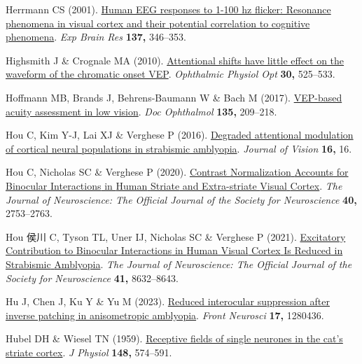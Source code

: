 \documentclass[
  letterpaper,
  DIV=11,
  numbers=noendperiod]{scrartcl}
\newlength{\cslhangindent}
\newenvironment{CSLReferences}[2] %
 {\begin{list}{}{%
  \setlength{\itemindent}{0pt}
  \setlength{\leftmargin}{0pt}
  \setlength{\parsep}{0pt}
  \ifodd #1
   \setlength{\leftmargin}{\cslhangindent}
   \setlength{\itemindent}{-1\cslhangindent}
  \fi
  \setlength{\itemsep}{#2\baselineskip}}}
 {\end{list}}
\begin{document}
\begin{CSLReferences}{1}{1}
Herrmann CS (2001). \href{https://doi.org/10.1007/s002210100682}{Human
EEG responses to 1-100 hz flicker: Resonance phenomena in visual cortex
and their potential correlation to cognitive phenomena}. \emph{Exp Brain
Res} \textbf{137,} 346--353.

Highsmith J \& Crognale MA (2010).
\href{https://doi.org/10.1111/j.1475-1313.2010.00747.x}{Attentional
shifts have little effect on the waveform of the chromatic onset VEP}.
\emph{Ophthalmic Physiol Opt} \textbf{30,} 525--533.

Hoffmann MB, Brands J, Behrens-Baumann W \& Bach M (2017).
\href{https://doi.org/10.1007/s10633-017-9613-y}{VEP-based acuity
assessment in low vision}. \emph{Doc Ophthalmol} \textbf{135,} 209--218.

Hou C, Kim Y-J, Lai XJ \& Verghese P (2016).
\href{https://doi.org/10.1167/16.3.16}{Degraded attentional modulation
of cortical neural populations in strabismic amblyopia}. \emph{Journal
of Vision} \textbf{16,} 16.

Hou C, Nicholas SC \& Verghese P (2020).
\href{https://doi.org/10.1523/JNEUROSCI.2043-19.2020}{Contrast
{Normalization} {Accounts} for {Binocular} {Interactions} in {Human}
{Striate} and {Extra}-striate {Visual} {Cortex}}. \emph{The Journal of
Neuroscience: The Official Journal of the Society for Neuroscience}
\textbf{40,} 2753--2763.

Hou 侯川 C, Tyson TL, Uner IJ, Nicholas SC \& Verghese P (2021).
\href{https://doi.org/10.1523/JNEUROSCI.0268-21.2021}{Excitatory
{Contribution} to {Binocular} {Interactions} in {Human} {Visual}
{Cortex} {Is} {Reduced} in {Strabismic} {Amblyopia}}. \emph{The Journal
of Neuroscience: The Official Journal of the Society for Neuroscience}
\textbf{41,} 8632--8643.

Hu J, Chen J, Ku Y \& Yu M (2023).
\href{https://doi.org/10.3389/fnins.2023.1280436}{Reduced interocular
suppression after inverse patching in anisometropic amblyopia}.
\emph{Front Neurosci} \textbf{17,} 1280436.

Hubel DH \& Wiesel TN (1959).
\href{https://doi.org/10.1113/jphysiol.1959.sp006308}{Receptive fields
of single neurones in the cat's striate cortex}. \emph{J Physiol}
\textbf{148,} 574--591.


\end{CSLReferences}
\end{document}
